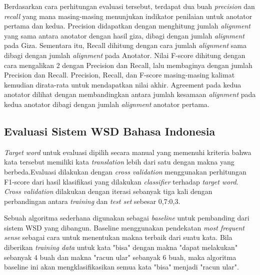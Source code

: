 Berdasarkan cara perhitungan evaluasi tersebut, terdapat dua buah \textit{precision} dan \textit{recall} yang mana masing-masing menunjukan indikator penilaian untuk anotator pertama dan kedua. Precision didapatkan dengan menghitung jumlah \textit{alignment} yang sama antara anotator dengan hasil giza, dibagi dengan jumlah \textit{alignment} pada Giza. Sementara itu, Recall dihitung dengan cara jumlah \textit{alignment} sama dibagi dengan jumlah \textit{alignment} pada Anotator. Nilai F-score dihitung dengan cara mengalikan 2 dengan Precision dan Recall, lalu membaginya dengan jumlah Precision dan Recall. Precision, Recall, dan F-score masing-masing kalimat kemudian dirata-rata untuk mendapatkan nilai akhir. Agreement pada kedua anotator dilihat dengan membandingkan antara jumlah kesamaan \textit{alignment} pada kedua anotator dibagi dengan jumlah \textit{alignment} anotator pertama.

\subsection{Evaluasi Sistem WSD Bahasa Indonesia}
\textit{Target word} untuk evaluasi dipilih secara manual yang memenuhi kriteria bahwa kata tersebut memiliki kata \textit{translation} lebih dari satu dengan makna yang berbeda.Evaluasi dilakukan dengan \textit{cross validation} menggunakan perhitungan F1-score dari hasil klasifikasi yang dilakukan \textit{classifier} terhadap \textit{target word}. \textit{Cross validation} dilakukan dengan iterasi sebanyak tiga kali dengan perbandingan antara \textit{training} dan \textit{test set} sebesar 0,7:0,3.

Sebuah algoritma sederhana digunakan sebagai \textit{baseline} untuk pembanding dari sistem WSD yang dibangun. Baseline menggunakan pendekatan \textit{most frequent sense} sebagai cara untuk menentukan makna terbaik dari suatu kata. Bila diberikan \textit{training data} untuk kata "bisa" dengan makna "dapat melakukan" sebanyak 4 buah dan makna "racun ular" sebanyak 6 buah, maka algoritma baseline ini akan mengklasifikasikan semua kata "bisa" menjadi "racun ular".

